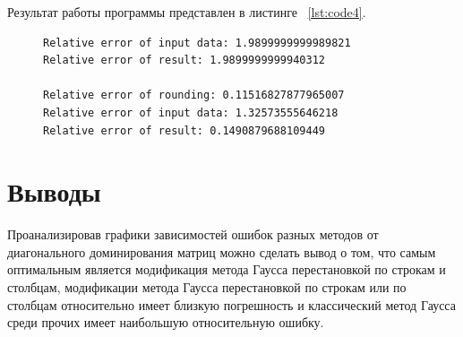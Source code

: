 \documentclass[a4paper, 14pt]{extarticle}
\begin{document}
Результат работы программы представлен в листинге ~\ref{lst:code4}.

\begin{figure}[!htb]
\begin{lstlisting}[caption={Результат работы программы},label={lst:code4}]
Relative error of input data: 1.9899999999989821
Relative error of result: 1.9899999999940312

Relative error of rounding: 0.11516827877965007
Relative error of input data: 1.32573555646218
Relative error of result: 0.1490879688109449
\end{lstlisting}
\end{figure}

\section{Выводы}\label{Sect::conclusion}

Проанализировав графики зависимостей ошибок разных методов от диагонального доминирования матриц можно сделать вывод о том, что самым оптимальным является модификация метода Гаусса перестановкой по строкам и столбцам, модификации метода Гаусса перестановкой по строкам или по столбцам относительно имеет близкую погрешность и классический метод Гаусса среди прочих имеет наибольшую относительную ошибку.
\end{document}
